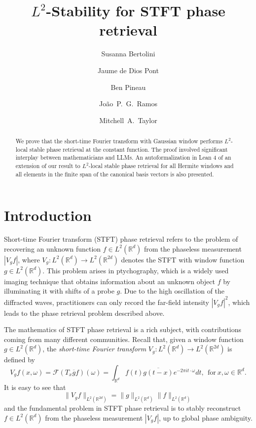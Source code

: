 \documentclass[11pt]{amsart}
\title{$L^2$-Stability for STFT phase retrieval}
\author[S.~Bertolini]{Susanna Bertolini}
\author[J.~de Dios Pont]{Jaume de Dios Pont}
\author[B.~Pineau]{Ben Pineau}
\author[J.~Ramos]{Jo\~ao~P.~G.\ Ramos}
\author[M.~Taylor]{Mitchell~A.\ Taylor}
\theoremstyle{remark}
\begin{document}
\begin{abstract}
We prove that the short-time Fourier transform with Gaussian window performs $L^2$-local stable phase retrieval at the constant function. The proof involved significant interplay between mathematicians and LLMs. An autoformalization in Lean 4 of an extension of our result to $L^2$-local stable phase retrieval for all Hermite windows and all elements in the finite span of the canonical basis vectors is also presented.
\end{abstract}

\maketitle

\section{Introduction}
Short-time Fourier transform (STFT) phase retrieval refers to the problem of recovering an unknown function $f\in L^2(\mathbb{R}^d)$ from the phaseless measurement $|V_gf|$, where $V_g:L^2(\mathbb{R}^d)\to L^2(\mathbb{R}^{2d})$ denotes the STFT with window function $g\in L^2(\mathbb{R}^d)$. This problem arises in ptychography, which is a widely used imaging technique that obtains information about an unknown object $f$ by illuminating it with shifts of a probe $g$. 
Due to the high oscillation of the diffracted waves, practitioners can only record the far-field intensity $|V_gf|^2$, which leads to the phase retrieval problem described above.
 \vspace{0.5em}

The mathematics of STFT phase retrieval is a rich subject, with contributions coming from many different communities. Recall that, given a window function $g\in L^2(\mathbb{R}^d)$, the \emph{short-time Fourier transform} $V_g:L^2(\mathbb{R}^d)\to L^2(\mathbb{R}^{2d})$ is defined by
\begin{equation*}\label{STFT Def}
V_g f(x,\omega)=\mathcal{F}(T_x\overline{g}f) (\omega)=\int_{\mathbb{R}^d} f(t)\overline{g(t-x)}e^{-2\pi it\cdot \omega}dt, \ \ \text{for}\ x,\omega\in \mathbb{R}^d.
\end{equation*}
It is easy to see that 
\begin{equation}\label{isometry}
    \|V_g f\|_{L^2(\mathbb{R}^{2d})}=\|g\|_{L^2(\mathbb{R}^{d})} \|f\|_{L^2(\mathbb{R}^{d})}
\end{equation} and the fundamental problem in STFT phase retrieval is to stably reconstruct $f\in L^2(\mathbb{R}^d)$ from the phaseless measurement $|V_g f|$, up to global phase ambiguity.  \vspace{0.5em}
\end{document}
